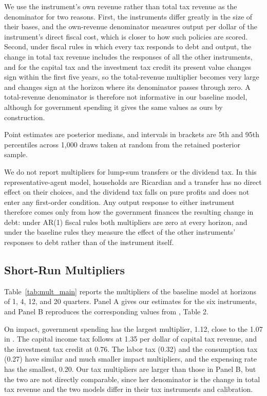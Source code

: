 \documentclass[article,11pt,letterpaper,fleqn]{article}
\theoremstyle{definition}
\numberwithin{equation}{section}
\begin{document}
We use the instrument's own revenue rather than total tax revenue as the denominator for two reasons. First, the instruments differ greatly in the size of their bases, and the own-revenue denominator measures output per dollar of the instrument's direct fiscal cost, which is closer to how such policies are scored. Second, under fiscal rules in which every tax responds to debt and output, the change in total tax revenue includes the responses of all the other instruments, and for the capital tax and the investment tax credit its present value changes sign within the first five years, so the total-revenue multiplier becomes very large and changes sign at the horizon where its denominator passes through zero. A total-revenue denominator is therefore not informative in our baseline model, although for government spending it gives the same values as ours by construction.

Point estimates are posterior medians, and intervals in brackets are 5th and 95th percentiles across 1{,}000 draws taken at random from the retained posterior sample.

We do not report multipliers for lump-sum transfers or the dividend tax. In this representative-agent model, households are Ricardian and a transfer has no direct effect on their choices, and the dividend tax falls on pure profits and does not enter any first-order condition. Any output response to either instrument therefore comes only from how the government finances the resulting change in debt: under AR(1) fiscal rules both multipliers are zero at every horizon, and under the baseline rules they measure the effect of the other instruments' responses to debt rather than of the instrument itself.


\subsection{Short-Run Multipliers}

Table~\ref{tab:mult_main} reports the multipliers of the baseline model at horizons of 1, 4, 12, and 20 quarters. Panel A gives our estimates for the six instruments, and Panel B reproduces the corresponding values from \citet{Zubairy2014}, Table 2.

On impact, government spending has the largest multiplier, 1.12, close to the 1.07 in \citet{Zubairy2014}. The capital income tax follows at 1.35 per dollar of capital tax revenue, and the investment tax credit at 0.76. The labor tax (0.32) and the consumption tax (0.27) have similar and much smaller impact multipliers, and the expensing rate has the smallest, 0.20. Our tax multipliers are larger than those in Panel B, but the two are not directly comparable, since her denominator is the change in total tax revenue and the two models differ in their tax instruments and calibration.
\end{document}
